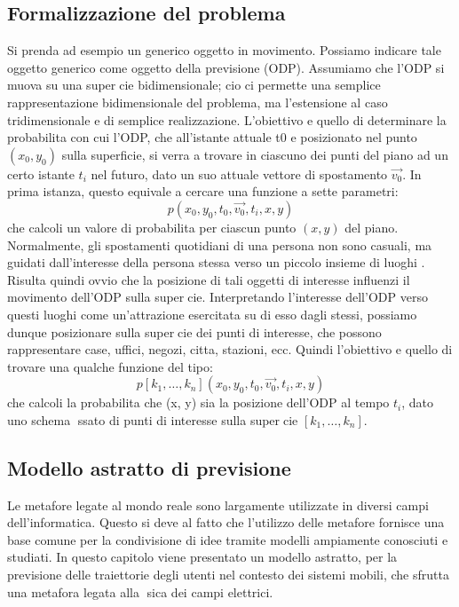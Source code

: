 \subsection{Formalizzazione del problema}
Si prenda ad esempio un generico oggetto in movimento. Possiamo indicare
tale oggetto generico come oggetto della previsione (ODP). Assumiamo che
l'ODP si muova su una supercie bidimensionale; cio ci permette una semplice
rappresentazione bidimensionale del problema, ma l'estensione al caso tridimensionale
e di semplice realizzazione. L'obiettivo e quello di determinare la
probabilita con cui l'ODP, che all'istante attuale t0 e posizionato nel punto
$(x_{0}, y_{0})$ sulla superficie, si verra a trovare in ciascuno dei punti del piano ad
un certo istante $t_{i}$ nel futuro, dato un suo attuale vettore di spostamento
$\vec{v_{0}}$.
In prima istanza, questo equivale a cercare una funzione a sette parametri:
\begin{equation}
p(x_{0},y_{0},t_{0},\vec{v_{0}},t_{i},x,y)
\end{equation}
che calcoli un valore di probabilita per ciascun punto $(x, y)$ del piano.
Normalmente, gli spostamenti quotidiani di una persona non sono casuali, ma
guidati dall'interesse della persona stessa verso un piccolo insieme di luoghi
\cite{cit_44}. Risulta quindi ovvio che la posizione di tali oggetti di interesse
influenzi il movimento dell'ODP sulla supercie. Interpretando l'interesse dell'ODP
verso questi luoghi come un'attrazione esercitata su di esso dagli stessi, possiamo
dunque posizionare sulla supercie dei punti di interesse, che possono rappresentare
case, uffici, negozi, citta, stazioni, ecc. Quindi l'obiettivo e quello di
trovare una qualche funzione del tipo:
\begin{equation}
p[k_{1},\dots,k_{n}](x_{0},y_{0},t_{0},\vec{v_{0}},t_{i},x,y)
\end{equation}
che calcoli la probabilita che (x, y) sia la posizione dell'ODP al tempo $t_{i}$,
dato uno schema ssato di punti di interesse sulla supercie $[k_{1},\dots,k_{n}]$.

\subsection{Modello astratto di previsione}
Le metafore legate al mondo reale sono largamente utilizzate in diversi campi
dell'informatica. Questo si deve al fatto che l'utilizzo delle metafore fornisce
una base comune per la condivisione di idee tramite modelli ampiamente
conosciuti e studiati. In questo capitolo viene presentato un modello astratto,
per la previsione delle traiettorie degli utenti nel contesto dei sistemi mobili,
che sfrutta una metafora legata alla sica dei campi elettrici.

